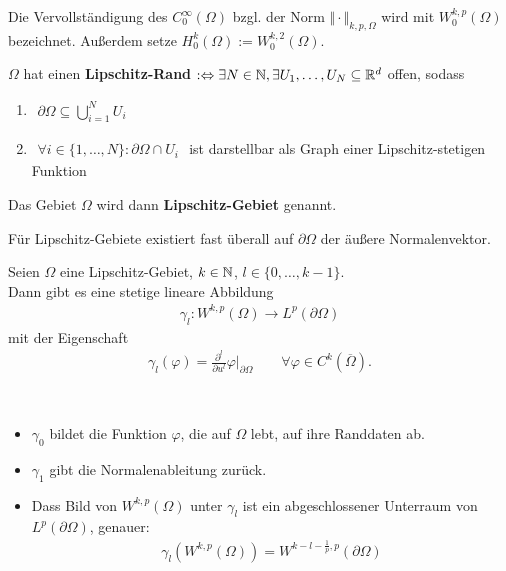 \begin{definition}
Die Vervollständigung des $C_0^\infty(\Omega)$ bzgl. der Norm $\Vert\cdot\Vert_{k,p,\Omega}$ wird mit $W_0^{k,p}(\Omega)$ bezeichnet. Außerdem setze $H_0^k(\Omega):=W_0^{k,2}(\Omega)$.
\end{definition}

\begin{definition}\enter
$\Omega$ hat einen \textbf{Lipschitz-Rand} $:\Leftrightarrow\exists N\in\mathbb{N},\exists U_1,\ldots,U_N\subseteq\mathbb{R}^d$ offen, sodass
\begin{enumerate}
\item $
\begin{aligned}
\partial\Omega\subseteq\bigcup\limits^N_{i=1} U_i
\end{aligned}$
\item $
\begin{aligned}
\forall i\in\lbrace1,\ldots,N\rbrace:\partial\Omega\cap U_i
\end{aligned}$
 ist darstellbar als Graph einer Lipschitz-stetigen Funktion
\end{enumerate}
Das Gebiet $\Omega$ wird dann \textbf{Lipschitz-Gebiet} genannt.
\end{definition}

\begin{bemerkung}
Für Lipschitz-Gebiete existiert fast überall auf $\partial\Omega$ der äußere Normalenvektor.
\end{bemerkung}

\begin{satz}[Spursatz]\enter
Seien $\Omega$ eine Lipschitz-Gebiet, $k\in\mathbb{N}$, $l\in\lbrace 0,\ldots,k-1\rbrace$.\\
Dann gibt es eine stetige lineare Abbildung
\begin{align*}
\gamma_l:W^{k,p}(\Omega)\rightarrow L^p(\partial\Omega)
\end{align*}
mit der Eigenschaft
\begin{align*}
\gamma_l(\varphi)=\frac{\partial^l}{\partial u^l}\varphi|_{\partial\Omega}\qquad\forall\varphi\in C^k(\overline{\Omega}).
\end{align*}
\end{satz}

\begin{bemerkung}\
\begin{itemize}
\item $\gamma_0$ bildet die Funktion $\varphi$, die auf $\Omega$ lebt, auf ihre Randdaten ab.
\item  $\gamma_1$ gibt die Normalenableitung zurück.
\item Dass Bild von $W^{k,p}(\Omega)$ unter $\gamma_l$ ist ein abgeschlossener Unterraum von $L^p(\partial\Omega)$, genauer:
\begin{align*}
\gamma_l\left(W^{k,p}(\Omega)\right)=W^{k-l-\frac{1}{p},p}(\partial\Omega)
\end{align*}
\end{itemize}
\end{bemerkung}

